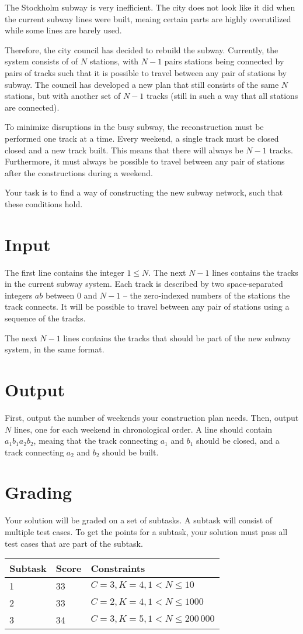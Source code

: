 \def\version{1}
The Stockholm subway is very inefficient.
The city does not look like it did when the current subway lines were built, meaing certain parts are highly overutilized while some lines are barely used.

Therefore, the city council has decided to rebuild the subway.
Currently, the system consists of of $N$ stations, with $N - 1$ pairs stations being connected by pairs of tracks such that it is possible to travel between any pair of stations by subway.
The council has developed a new plan that still consists of the same $N$ stations, but with another set of $N - 1$ tracks (still in such a way that all stations are connected).

To minimize disruptions in the busy subway, the reconstruction must be performed one track at a time.
Every weekend, a single track must be closed closed and a new track built.
This means that there will always be $N - 1$ tracks.
Furthermore, it must always be possible to travel between any pair of stations after the constructions during a weekend.

Your task is to find a way of constructing the new subway network, such that these conditions hold.

\section*{Input}
The first line contains the integer $1 \le N$.
The next $N - 1$ lines contains the tracks in the current subway system.
Each track is described by two space-separated integers $a b$ between $0$ and $N - 1$ -- the zero-indexed numbers of the stations the track connects.
It will be possible to travel between any pair of stations using a sequence of the tracks.

The next $N - 1$ lines contains the tracks that should be part of the new subway system, in the same format.

\section*{Output}
First, output the number of weekends your construction plan needs.
Then, output $N$ lines, one for each weekend in chronological order.
A line should contain $a_1 b_1 a_2 b_2$, meaing that the track connecting $a_1$ and $b_1$ should be closed, and a track connecting $a_2$ and $b_2$ should be built.


\section*{Grading}
Your solution will be graded on a set of subtasks.
A subtask will consist of multiple test cases.
To get the points for a subtask, your solution must pass all test cases that are part of the subtask.

\noindent
\begin{tabular}{| l | l | l |}
\hline
Subtask & Score & Constraints \\ \hline
1       & 33    & $C = 3, K = 4, 1 < N \le 10$ \\ \hline
2       & 33    & $C = 2, K = 4, 1 < N \le 1000$ \\ \hline
3       & 34    & $C = 3, K = 5, 1 < N \le 200\,000$ \\ \hline
\end{tabular}
